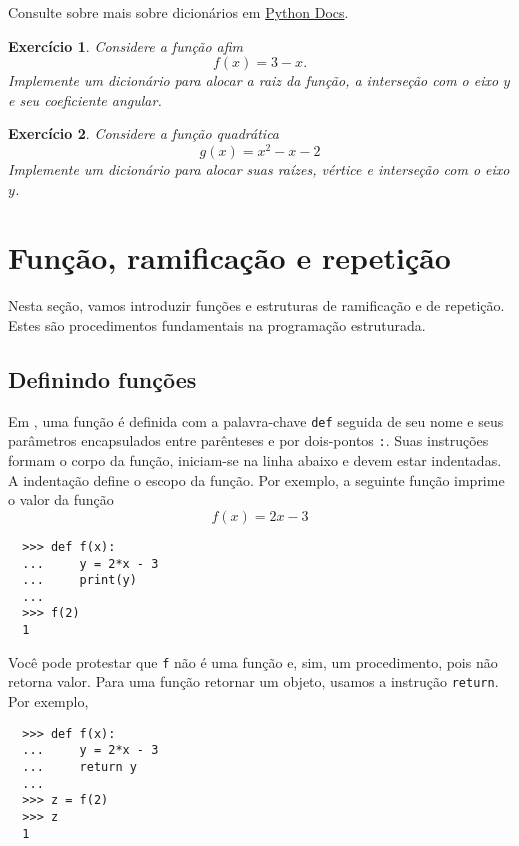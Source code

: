 \documentclass[12pt]{article}
\newtheorem{exr}{Exercício}[section]
\begin{document}
\begin{obs}
  Consulte sobre mais sobre dicionários em \href{https://docs.python.org/3/tutorial/datastructures.html#dictionaries}{Python Docs}.
\end{obs}

\begin{exr}
  Considere a função afim
  \begin{equation}
    f(x) = 3 - x.
  \end{equation}
  Implemente um dicionário para alocar a raiz da função, a interseção com o eixo $y$ e seu coeficiente angular.
\end{exr}

\begin{exr}
  Considere a função quadrática
  \begin{equation}
    g(x) = x^2 - x - 2
  \end{equation}
  Implemente um dicionário para alocar suas raízes, vértice e interseção com o eixo $y$.
\end{exr}

\section{Função, ramificação e repetição}

Nesta seção, vamos introduzir funções e estruturas de ramificação e de repetição. Estes são procedimentos fundamentais na programação estruturada.

\subsection{Definindo funções}

Em {\python}, uma função é definida com a palavra-chave \lstinline+def+ seguida de seu nome e seus parâmetros encapsulados entre parênteses e por dois-pontos \lstinline+:+. Suas instruções formam o corpo da função, iniciam-se na linha abaixo e devem estar indentadas. A indentação define o escopo da função. Por exemplo, a seguinte função imprime o valor da função
\begin{equation}
  f(x) = 2x - 3
\end{equation}
\begin{lstlisting}
  >>> def f(x):
  ...     y = 2*x - 3
  ...     print(y)
  ... 
  >>> f(2)
  1
\end{lstlisting}
Você pode protestar que \lstinline+f+ não é uma função e, sim, um procedimento, pois não retorna valor. Para uma função retornar um objeto, usamos a instrução \lstinline+return+. Por exemplo,
\begin{lstlisting}
  >>> def f(x):
  ...     y = 2*x - 3
  ...     return y
  ... 
  >>> z = f(2)
  >>> z
  1
\end{lstlisting}
\end{document}
